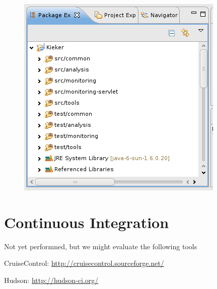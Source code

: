 \begin{compactenum}
\begin{compactenum}
\begin{figure}[H]\centering
\includegraphics[scale=0.4]{figures/eclipse-ProjectTree}
\caption{}
\label{fig:eclipse:projectTree}
\end{figure}

\end{compactenum}
\end{compactenum}

\section{Continuous Integration}

Not yet performned, but we might evaluate the following tools

\begin{compactitem}
\item CruiseControl: \url{http://cruisecontrol.sourceforge.net/}
\item Hudson: \url{http://hudson-ci.org/}
\end{compactitem}


